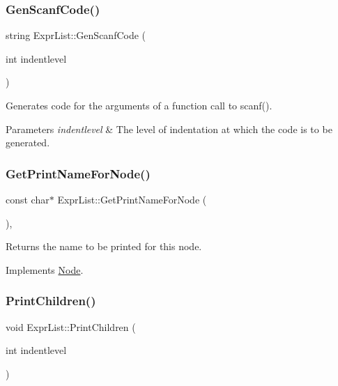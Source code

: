 \subsubsection{\texorpdfstring{Gen\+Scanf\+Code()}{GenScanfCode()}}
{\footnotesize\ttfamily string Expr\+List\+::\+Gen\+Scanf\+Code (\begin{DoxyParamCaption}\item[{int}]{indentlevel }\end{DoxyParamCaption})}

Generates code for the arguments of a function call to scanf(). 
\begin{DoxyParams}{Parameters}
{\em indentlevel} & The level of indentation at which the code is to be generated. \\
\hline
\end{DoxyParams}
\mbox{\label{class_expr_list_a1e1febf2b8902accb2751e521b0e16ae}} 
\subsubsection{\texorpdfstring{Get\+Print\+Name\+For\+Node()}{GetPrintNameForNode()}}
{\footnotesize\ttfamily const char$\ast$ Expr\+List\+::\+Get\+Print\+Name\+For\+Node (\begin{DoxyParamCaption}{ }\end{DoxyParamCaption})\hspace{0.3cm}{\ttfamily [inline]}, {\ttfamily [virtual]}}

Returns the name to be printed for this node. 

Implements \hyperlink{class_node_a56e29657306ffb004d69c6929ae44269}{Node}.

\mbox{\label{class_expr_list_a2a55a32d64cd33b4424d29f1a36e94f8}} 
\subsubsection{\texorpdfstring{Print\+Children()}{PrintChildren()}}
{\footnotesize\ttfamily void Expr\+List\+::\+Print\+Children (\begin{DoxyParamCaption}\item[{int}]{indentlevel }\end{DoxyParamCaption})\hspace{0.3cm}{\ttfamily [virtual]}}

